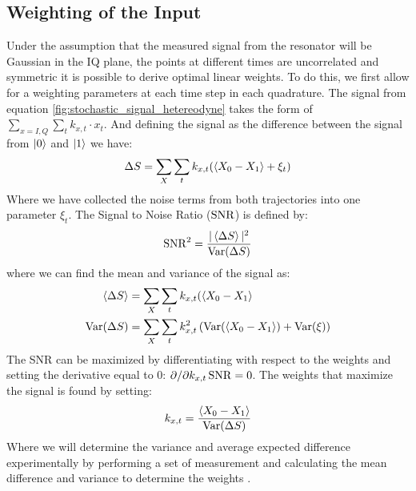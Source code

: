 \subsection{Weighting of the Input}
Under the assumption that the measured signal from the resonator will be Gaussian in the IQ plane, the points at different times are uncorrelated and symmetric \cite{magesan}  it is possible to derive optimal linear weights. To do this, we first allow for a weighting parameters at each time step in each quadrature. The signal from equation \ref{fig:stochastic_signal_hetereodyne} takes the form of $\sum_{x = I, Q}\sum_t k_{x, t} \cdot x_t$. And defining the signal as the difference between the signal from $\ket{0}$ and $\ket{1}$ we have:
\begin{equation}
    \Delta S = \sum_X \sum_t k_{x, t} (\expval{X_0 - X_1} + \xi_t)
\end{equation}
Where we have collected the noise terms from both trajectories into one parameter $\xi_t$. The Signal to Noise Ratio ($\operatorname{SNR}$) is defined by: %
\begin{equation}
    \operatorname{SNR}^2 = \frac{|\expval{\Delta S}|^2}{\operatorname{Var}(\Delta S)} 
\end{equation}
where we can find the mean and variance of the signal as:
\begin{align}
    \expval{\Delta S} &= \sum_X \sum_t k_{x, t} (\expval{X_0 - X_1} \\
    \operatorname{Var}(\Delta S) &= \sum_X \sum_t k_{x, t}^2 \left( \operatorname{Var}(\expval{X_0 - X_1}) + \operatorname{Var}(\xi) \right)
\end{align}
The SNR can be maximized by differentiating with respect to the weights and setting the derivative equal to $0$: $\partial / \partial k_{x, t} \operatorname{SNR} = 0$. The weights that maximize the signal is found by  setting:
\begin{equation}
    k_{x, t} = \frac{\expval{X_0 - X_1}}{\operatorname{Var}(\Delta S)}
\end{equation}
Where we will determine the variance and average expected difference experimentally by performing a set of measurement and calculating the mean difference and variance to determine the weights \cite{ryan_tomography_2015}.


